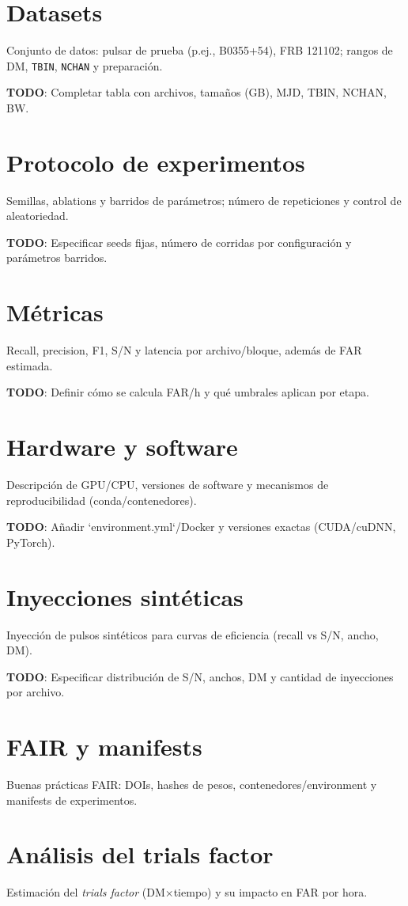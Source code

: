
\section{Datasets}
Conjunto de datos: pulsar de prueba (p.ej., B0355+54), FRB 121102; rangos de DM, \texttt{TBIN}, \texttt{NCHAN} y preparación.

\textbf{TODO}: Completar tabla con archivos, tamaños (GB), MJD, TBIN, NCHAN, BW.

\section{Protocolo de experimentos}
Semillas, ablations y barridos de parámetros; número de repeticiones y control de aleatoriedad.

\textbf{TODO}: Especificar seeds fijas, número de corridas por configuración y parámetros barridos.

\section{Métricas}
Recall, precision, F1, S/N y latencia por archivo/bloque, además de FAR estimada.

\textbf{TODO}: Definir cómo se calcula FAR/h y qué umbrales aplican por etapa.

\section{Hardware y software}
Descripción de GPU/CPU, versiones de software y mecanismos de reproducibilidad (conda/contenedores).

\textbf{TODO}: Añadir `environment.yml`/Docker y versiones exactas (CUDA/cuDNN, PyTorch).

\section{Inyecciones sintéticas}
Inyección de pulsos sintéticos para curvas de eficiencia (recall vs S/N, ancho, DM).

\textbf{TODO}: Especificar distribución de S/N, anchos, DM y cantidad de inyecciones por archivo.

\section{FAIR y manifests}
Buenas prácticas FAIR: DOIs, hashes de pesos, contenedores/environment y manifests de experimentos.

\section{Análisis del trials factor}
Estimación del \textit{trials factor} (DM\(\times\)tiempo) y su impacto en FAR por hora.


